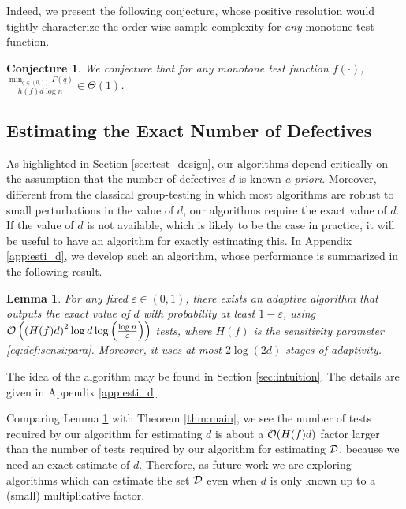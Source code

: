 \documentclass[onecolumn,letterpaper]{IEEEtran}
\newtheorem{lemma}{Lemma}
\newtheorem{conjecture}{Conjecture}
\newcommand{\cD}{{\cal D}}
\newcommand{\cO}{{\cal O}}
\newcommand{\cp}{{q}}
\newcommand{\fh}{{h(f)}}
\newcommand{\fH}{{H(f)}}
\newcommand{\ftau}{{\Gamma}}
\newcommand{\fT}{{\ftau(\cp)}}
\newcommand{\esterr}{{\varepsilon}}
\begin{document}
Indeed, we present the following conjecture, whose positive resolution would tightly characterize the order-wise sample-complexity for {\it any} monotone test function.

\begin{conjecture} \label{conj:optimal}
We conjecture that for any monotone test function $f(\cdot)$, $\frac{\min_{\cp \in (0,1)} \fT}{\fh d \log n} \in \Theta (1)$. 
\end{conjecture}

\subsection{Estimating the Exact Number of Defectives}\label{subsec:est-d}
As highlighted in Section \ref{sec:test_design}, our algorithms depend critically on the assumption that the number of defectives $d$ is known {\it a priori}. Moreover, different from the classical group-testing in which most algorithms are robust to small perturbations in the value of $d$, our algorithms require the exact value of $d$. If the value of $d$ is not available, which is likely to be the case in practice, it will be useful to have an algorithm for exactly estimating this. In Appendix \ref{app:esti_d}, we develop such an algorithm, whose performance is summarized in the following result. 

\begin{lemma}
\label{lem:estimation:d}
For any fixed $\esterr\in (0,1)$, there exists an adaptive algorithm that outputs the exact value of $d$ with probability at least $1-\esterr$, using $\cO \left(\left(\fH d\right)^2 \log d \log\left(\frac{\log n}{\esterr }\right)\right)$ tests, where $\fH$ is the sensitivity parameter \eqref{eq:def:sensi:para}. Moreover, it uses at most $2\log (2d)$ stages of adaptivity.
\end{lemma}

The idea of the algorithm may be found in Section \ref{sec:intuition}. The details are given in Appendix \ref{app:esti_d}.

Comparing Lemma \ref{lem:estimation:d} with Theorem \ref{thm:main}, we see the number of tests required by our algorithm for estimating $d$ is about a  $\cO (\fH d)$ factor larger than the number of tests required by our algorithm for estimating $\cD$, because we need an exact estimate of $d$.   Therefore, as future work we are exploring algorithms which can estimate the set $\cD$ even when $d$ is only known up to a (small) multiplicative factor.
\end{document}
